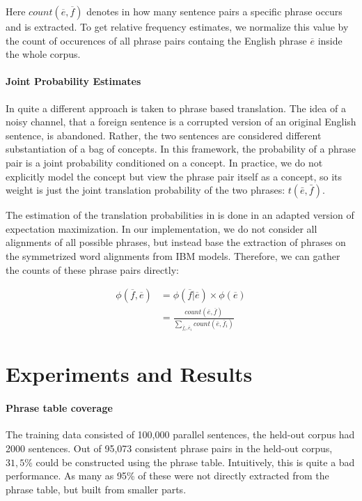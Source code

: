 \documentclass[11pt]{article}
\begin{document}
Here $count(\overline{e}, \overline{f})$ denotes in how many sentence pairs a specific phrase occurs and is extracted. To get relative frequency estimates, we normalize this value by the count of occurences of all phrase pairs containg the English phrase $\overline{e}$ inside the whole corpus.


\paragraph{Joint Probability Estimates}
In \cite{marcu2002} quite a different approach is taken to phrase based translation. The idea of a noisy channel, that a foreign sentence is a corrupted version of an original English sentence, is abandoned. Rather, the two sentences are considered different substantiation of a bag of concepts. In this framework, the probability of a phrase pair is a joint probability conditioned on a concept. In practice, we do not explicitly model the concept but view the phrase pair itself as a concept, so its weight is just the joint translation probability of the two phrases: $t(\bar{e},\bar{f})$.

The estimation of the translation probabilities in \cite{marcu2002} is done in an adapted version of expectation maximization. 
In our implementation, we do not consider all alignments of all possible phrases, but instead base the extraction of phrases on the symmetrized word alignments from IBM models. Therefore, we can gather the counts of these phrase pairs directly:

\begin{align*}
\phi(\overline{f},\overline{e}) &=\phi(\overline{f}|\overline{e}) \times \phi(\overline{e}) \\
&=\frac{count(\overline{e}, \overline{f})}{\sum_{\overline{f}_i, \overline{e}_i} count(\overline{e},\overline{f}_i)}
\end{align*}


\section{Experiments and Results}
\label{Eval}



\paragraph{Phrase table coverage}
The training data consisted of 100,000 parallel sentences, the held-out corpus had 2000 sentences. Out of 95,073 consistent phrase pairs in the held-out corpus, $31,5\%$ could be constructed using the phrase table. Intuitively, this is quite a bad performance. As many as 95\% of these were not directly extracted from the phrase table, but built from smaller parts.
\end{document}
